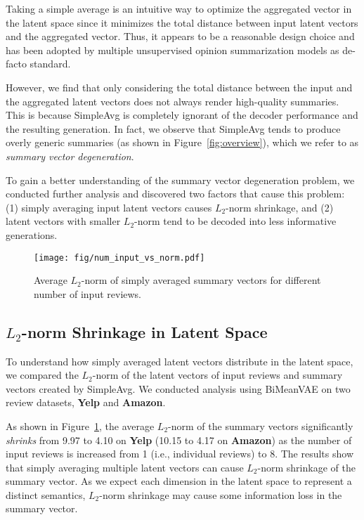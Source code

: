 \documentclass[11pt]{article}
\newcommand{\name}{\mbox{\sc BiMeanVAE}}
\newcommand{\simpleavg}{\mbox{SimpleAvg}}
\newcommand{\yelp}{\mbox{\bf Yelp}}
\newcommand{\amazon}{\mbox{\bf Amazon}}
\begin{document}
Taking a simple average is an intuitive way to optimize the aggregated vector in the latent space since it minimizes the total distance between input latent vectors and the aggregated vector. Thus, it appears to be a reasonable design choice and has been adopted by multiple unsupervised opinion summarization models as de-facto standard. 

However, we find that only considering the total distance between the input and the aggregated latent vectors does not always render high-quality summaries. This is because \simpleavg{} is completely ignorant of the decoder performance and the resulting generation. In fact, we observe that \simpleavg{} tends to produce overly generic summaries (as shown in Figure~\ref{fig:overview}), which we refer to as {\em summary vector degeneration}.

To gain a better understanding of the summary vector degeneration problem, we conducted further analysis and discovered two factors that cause this problem: 
(1) simply averaging input latent vectors causes $L_2$-norm shrinkage, and (2) latent vectors with smaller $L_2$-norm tend to be decoded into less informative generations.

\begin{figure}[t]
    \centering
    \texttt{[image: fig/num\_input\_vs\_norm.pdf]}
    \caption{Average $L_2$-norm of simply averaged summary vectors for different number of input reviews.}\label{fig:num_input_vs_norm}
\end{figure}

\subsection{$L_2$-norm Shrinkage in Latent Space}
\label{sub:avg_degenerate}

To understand how simply averaged latent vectors distribute in the latent space, we compared the $L_2$-norm of the latent vectors of input reviews and summary vectors created by \simpleavg.
We conducted analysis using \name{} on two review datasets, \yelp{} and \amazon. 

As shown in Figure~\ref{fig:num_input_vs_norm}, the average $L_2$-norm of the summary vectors significantly {\em shrinks} from 9.97 to 4.10 on \yelp{} (10.15 to 4.17 on \amazon) as the number of input reviews is increased from 1 (i.e., individual reviews) to 8.
The results show that simply averaging multiple latent vectors can cause $L_2$-norm shrinkage of the summary vector.
As we expect each dimension in the latent space to represent a distinct semantics, 
$L_2$-norm shrinkage may cause some information loss in the summary vector.
\end{document}

